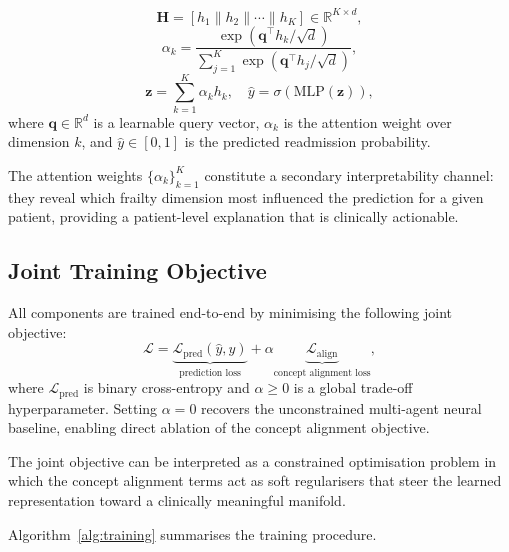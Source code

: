\documentclass[review,12pt,authoryear]{elsarticle}
\begin{document}
\begin{equation}
  \mathbf{H} = [h_1 \| h_2 \| \cdots \| h_K] \in \mathbb{R}^{K \times d},
  \label{eq:concat}
\end{equation}
\begin{equation}
  \alpha_k = \frac{\exp(\mathbf{q}^\top h_k / \sqrt{d})}{\sum_{j=1}^K \exp(\mathbf{q}^\top h_j / \sqrt{d})},
  \label{eq:attention}
\end{equation}
\begin{equation}
  \mathbf{z} = \sum_{k=1}^K \alpha_k h_k, \quad \hat{y} = \sigma\!\left(\text{MLP}(\mathbf{z})\right),
  \label{eq:prediction}
\end{equation}
where $\mathbf{q} \in \mathbb{R}^d$ is a learnable query vector, $\alpha_k$ is the attention weight over dimension $k$, and $\hat{y} \in [0,1]$ is the predicted readmission probability.

The attention weights $\{\alpha_k\}_{k=1}^K$ constitute a secondary interpretability channel: they reveal which frailty dimension most influenced the prediction for a given patient, providing a patient-level explanation that is clinically actionable.

\subsection{Joint Training Objective}
\label{subsec:objective}

All components are trained end-to-end by minimising the following joint objective:
\begin{equation}
  \mathcal{L} = \underbrace{\mathcal{L}_{\text{pred}}(\hat{y}, y)}_{\text{prediction loss}} + \alpha \underbrace{\mathcal{L}_{\text{align}}}_{\text{concept alignment loss}},
  \label{eq:total_loss}
\end{equation}
where $\mathcal{L}_{\text{pred}}$ is binary cross-entropy and $\alpha \geq 0$ is a global trade-off hyperparameter.
Setting $\alpha = 0$ recovers the unconstrained multi-agent neural baseline, enabling direct ablation of the concept alignment objective.

The joint objective can be interpreted as a constrained optimisation problem in which the concept alignment terms act as soft regularisers that steer the learned representation toward a clinically meaningful manifold.

Algorithm~\ref{alg:training} summarises the training procedure.
\end{document}
